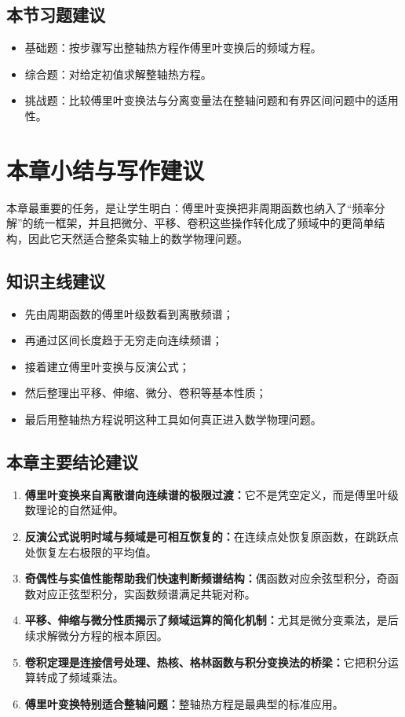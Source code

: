 \subsection*{本节习题建议}
\begin{itemize}
    \item 基础题：按步骤写出整轴热方程作傅里叶变换后的频域方程。
    \item 综合题：对给定初值求解整轴热方程。
    \item 挑战题：比较傅里叶变换法与分离变量法在整轴问题和有界区间问题中的适用性。
\end{itemize}

\section{本章小结与写作建议}

\begin{wulibj}[一句话回看本章]
本章最重要的任务，是让学生明白：傅里叶变换把非周期函数也纳入了``频率分解''的统一框架，并且把微分、平移、卷积这些操作转化成了频域中的更简单结构，因此它天然适合整条实轴上的数学物理问题。
\end{wulibj}

\subsection*{知识主线建议}
\begin{itemize}
    \item 先由周期函数的傅里叶级数看到离散频谱；
    \item 再通过区间长度趋于无穷走向连续频谱；
    \item 接着建立傅里叶变换与反演公式；
    \item 然后整理出平移、伸缩、微分、卷积等基本性质；
    \item 最后用整轴热方程说明这种工具如何真正进入数学物理问题。
\end{itemize}

\subsection*{本章主要结论建议}
\begin{zhongyao}[本章主要结论]
\raggedright
\begin{enumerate}
    \item \textbf{傅里叶变换来自离散谱向连续谱的极限过渡：}它不是凭空定义，而是傅里叶级数理论的自然延伸。
    \item \textbf{反演公式说明时域与频域是可相互恢复的：}在连续点处恢复原函数，在跳跃点处恢复左右极限的平均值。
    \item \textbf{奇偶性与实值性能帮助我们快速判断频谱结构：}偶函数对应余弦型积分，奇函数对应正弦型积分，实函数频谱满足共轭对称。
    \item \textbf{平移、伸缩与微分性质揭示了频域运算的简化机制：}尤其是微分变乘法，是后续求解微分方程的根本原因。
    \item \textbf{卷积定理是连接信号处理、热核、格林函数与积分变换法的桥梁：}它把积分运算转成了频域乘法。
    \item \textbf{傅里叶变换特别适合整轴问题：}整轴热方程是最典型的标准应用。
\end{enumerate}
\end{zhongyao}

